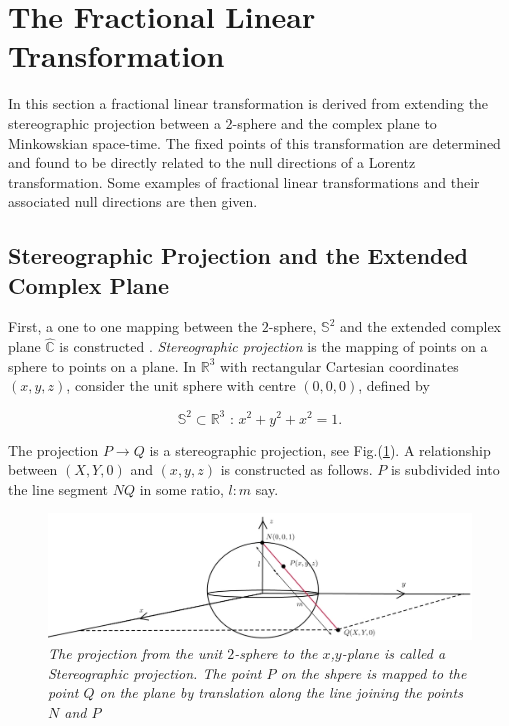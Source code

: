 \section{The Fractional Linear Transformation}\label{Fractional_Section_Extended_Complex}

In this section a fractional linear transformation is derived from extending the stereographic projection between a $2$-sphere and the complex plane to Minkowskian space-time. The fixed points of this transformation are determined and found to be directly related to the null directions of a Lorentz transformation. Some examples of fractional linear transformations and their associated null directions are then given. 

\subsection{Stereographic Projection and the Extended Complex Plane}\label{Section_Stereographic_Extended_Complex}

First, a one to one mapping between the $2$-sphere, $\mathbb{S}^2$ and the extended complex plane $\hat{\mathbb{C}}$ is constructed \cite[p. 10]{Spinors_I_Penrose}. \textit{Stereographic projection} is the mapping of points on a sphere to points on a plane. In $\mathbb{R}^3$ with rectangular Cartesian coordinates $(x, y, z)$, consider the unit sphere with centre $(0,0,0)$, defined by

\begin{equation*}
\mathbb{S}^2 \subset \mathbb{R}^3 \text{ : } x^2 + y^2 + x^2 = 1.
\end{equation*}

\noindent The projection $P \rightarrow Q$ is a stereographic projection, see Fig.(\ref{Stereographic_Projecttion_Fig}). A relationship between $(X,Y,0)$ and $(x,y,z)$ is constructed as follows. $P$ is subdivided into the line segment $NQ$ in some ratio, $l:m$ say. 

\begin{figure}[h!]
\begin{center}
\caption{\textit{The projection from the unit $2$-sphere to the $x$,$y$-plane is called a Stereographic projection. The point $P$ on the shpere is mapped to the point $Q$ on the plane by translation along the line joining the points $N$ and $P$}}
\label{Stereographic_Projecttion_Fig}
\includegraphics[scale=0.50]{figs/4_1.jpg}
\end{center}
\end{figure}

